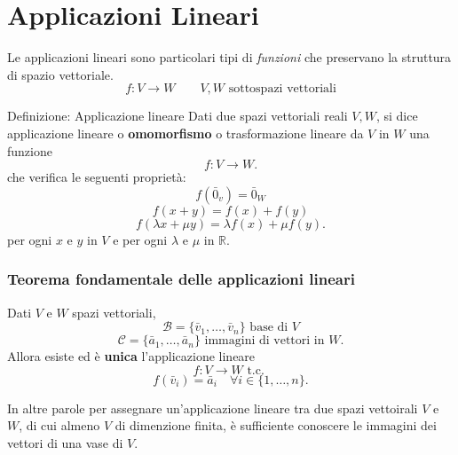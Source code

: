 \documentclass[x11names]{article}
\begin{document}

\newpage
\section{Applicazioni Lineari}
Le applicazioni lineari sono particolari tipi di \textit{funzioni} che preservano la struttura di spazio vettoriale.
\[
f: V \longrightarrow W \qquad V,W \text{ sottospazi vettoriali}
\] 


\begin{center}
\colorbox{myblue}{\begin{minipage}{5.75in}
\begin{blues}{Definizione: Applicazione lineare}
	Dati due spazi vettoriali reali $V,W$, si dice applicazione lineare o \textbf{omomorfismo} o trasformazione lineare da $V$ in  $W$ una funzione
\[
f: V \longrightarrow W 
.\] 
che verifica le seguenti proprietà:
\[
f\left(\bar{0}_{v}\right) = \bar{0}_{W}
\] 
\[
f\left(x+y\right) = f\left(x\right) + f\left(y\right)
\] 
\[
f\left(\lambda x + \mu y\right) = \lambda f\left(x\right) + \mu f\left(y\right) 
.\] 
per ogni $x$ e  $y$ in $V$ e per ogni $\lambda$ e $\mu$ in $\mathbb{R}$.
\end{blues}
\end{minipage}}        
\end{center}
\begin{center}
	\colorbox{myred}{\begin{minipage}{5.75in}
			\begin{redes}{}
				\subsubsection{Teorema fondamentale delle applicazioni lineari}
				Dati $V$ e  $W$ spazi vettoriali,
				\[
				\mathscr{B} = \{\bar{v}_{1},\dots,\bar{v}_{n}\} \text{ base di }V
				\] 
				\[
				\mathscr{C} = \{\bar{a}_{1},\dots,\bar{a}_{n}\} \text{ immagini di vettori in }W
				.\] 
				Allora esiste ed è \textbf{unica} l'applicazione lineare
				\[
				f: V \longrightarrow W \text{ t.c. }
				\] 
				\[
				f\left(\bar{v}_{i}\right) = \bar{a}_{i} \quad \forall i \in \{1,\dots,n\}
				.\] 
			\end{redes}
	\end{minipage}}        
\end{center}

In altre parole per assegnare un'applicazione lineare tra due spazi vettoirali $V$ e $W$, di cui almeno $V$ di dimenzione finita, è sufficiente conoscere le immagini dei vettori di una vase di $V$.
\end{document}
